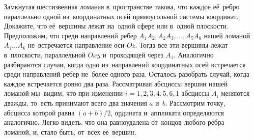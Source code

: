 \problem
Замкнутая шестизвенная ломаная в~пространстве такова, что каждое её~ребро
параллельно одной из~координатных осей прямоугольной системы координат.
Докажите, что её~вершины лежат на~одной сфере или в~одной плоскости.
\solution
Предположим, что среди направлений ребер $A_1 A_2, A_2 A_3, \ldots, A_5 A_6$
нашей ломаной $A_1 \ldots A_6$ не~встречается направление оси $Oz$.
Тогда все эти вершины лежат в~плоскости, параллельной $Oxy$ и~проходящей через
$A_1$.
Аналогично разбираются случаи, когда одно из~направлений координатных осей
встречается среди направлений ребер не~более одного раза.
Осталось разобрать случай, когда каждое встречается ровно два раза.
Рассматривая абсциссы вершин нашей ломаной мы~видим, что при изменении
$i = 1, 2, 3, 4, 5, 6, 1$ абсциссы $A_i$ меняются дважды, то~есть 
принимают всего два значения $a$ и~$b$.
Рассмотрим точку, абсцисса которой равна $(a + b) / 2$, ордината и~аппликата
определяются аналогично.
Легко видеть, что она равноудалена от~концов любого ребра ломаной, и, стало
быть, от~всех её~вершин.
\endproblem
